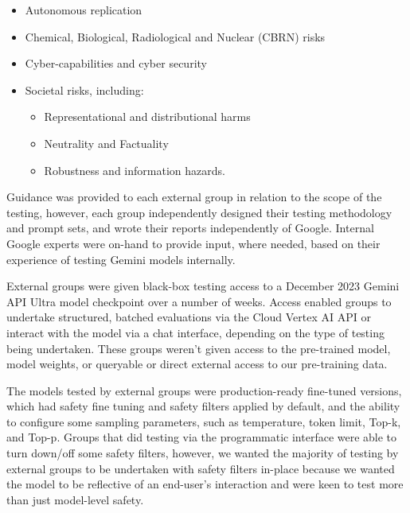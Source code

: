 \begin{itemize}
    \item Autonomous replication 
\item Chemical, Biological, Radiological and Nuclear (CBRN) risks 
\item Cyber-capabilities and cyber security 
\item Societal risks, including: 
\begin{itemize}
\item Representational and distributional harms 
\item Neutrality and Factuality 
\item Robustness and information hazards.  
\end{itemize}
\end{itemize}

Guidance was provided to each external group in relation to the scope of the testing, however, each group independently designed their testing methodology and prompt sets, and wrote their reports independently of Google. Internal Google experts were on-hand to provide input, where needed, based on their experience of testing Gemini models internally. 

External groups were given black-box testing access to a December 2023 Gemini API Ultra model checkpoint over a number of weeks. Access enabled groups to undertake structured, batched evaluations via the Cloud Vertex AI API or interact with the model via a chat interface, depending on the type of testing being undertaken. These groups weren’t given access to the pre-trained model, model weights, or queryable or direct external access to our pre-training data.

The models tested by external groups were production-ready fine-tuned versions, which had safety fine tuning and safety filters applied by default, and the ability to configure some sampling parameters, such as temperature, token limit, Top-k, and Top-p. Groups that did testing via the programmatic interface were able to turn down/off some safety filters, however, we wanted the majority of testing by external groups to be undertaken with safety filters in-place because we wanted the model to be reflective of an end-user’s interaction and were keen to test more than just model-level safety.

